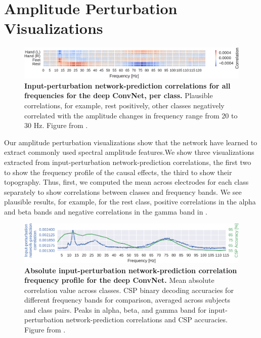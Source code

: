 \section{Amplitude Perturbation
Visualizations}\label{amplitude-perturbation-visualizations}



\begin{figure}[htb]
    \myfloatalign
    \includegraphics[width=1\linewidth]{images/Bandpower_Perturbation.ipynb.0.pdf-1.png}
    
    \caption[Per-class amplitude perturbation correlation profiles on high-gamma dataset]{
\textbf{Input-perturbation network-prediction correlations for all
frequencies for the deep ConvNet, per class.} Plausible correlations,
for example, rest positively, other classes negatively correlated with
the amplitude changes in frequency range from 20 to 30 Hz. Figure from
\citet{schirrmeisterdeephbm2017}.
}
\label{bandpower-perturbation-per-class-fig}
\end{figure}

Our amplitude perturbation visualizations show that the network have
learned to extract commonly used spectral amplitude features.We show
three visualizations extracted from input-perturbation
network-prediction correlations, the first two to show the frequency
profile of the causal effects, the third to show their topography. Thus,
first, we computed the mean across electrodes for each class separately
to show correlations between classes and frequency bands. We see
plausible results, for example, for the rest class, positive
correlations in the alpha and beta bands and negative correlations in
the gamma band in
.


\begin{figure}[htb]
    \myfloatalign
    \includegraphics[width=1\linewidth]{images/Bandpower_Perturbation.ipynb.12.pdf-1.png}
    
    \caption[Overall amplitude perturbation correlation profile on high-gamma dataset]{
\textbf{Absolute input-perturbation network-prediction correlation
frequency profile for the deep ConvNet.} Mean absolute correlation value
across classes. CSP binary decoding accuracies for different frequency
bands for comparison, averaged across subjects and class pairs. Peaks in
alpha, beta, and gamma band for input-perturbation network-prediction
correlations and CSP accuracies. Figure from
\citet{schirrmeisterdeephbm2017}.
}
\label{bandpower-overall-fig}
\end{figure}

